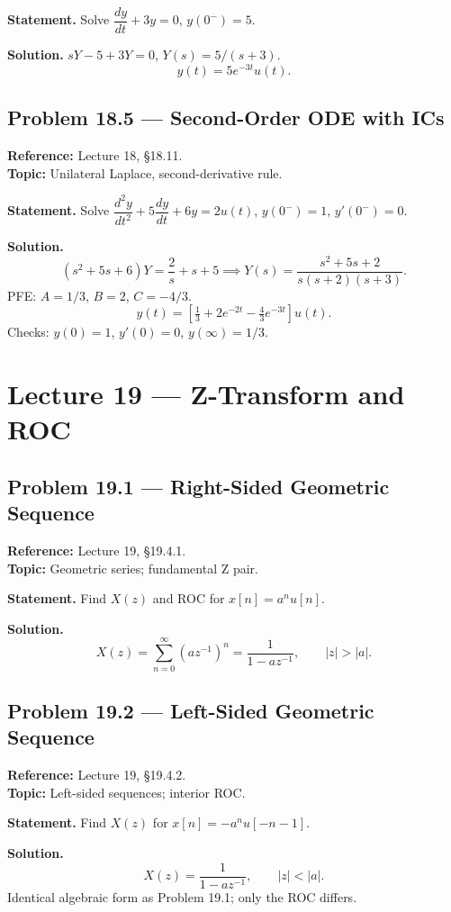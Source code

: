 \documentclass[11pt]{article}
\begin{document}
\textbf{Statement.} Solve $\dfrac{dy}{dt}+3y=0$, $y(0^-)=5$.

\textbf{Solution.} $sY-5+3Y=0$, $Y(s)=5/(s+3)$.
\[
\boxed{y(t) = 5e^{-3t}u(t)}.
\]

\subsection{Problem 18.5 --- Second-Order ODE with ICs}
\textbf{Reference:} Lecture 18, \S 18.11.\\
\textbf{Topic:} Unilateral Laplace, second-derivative rule.

\textbf{Statement.} Solve $\dfrac{d^2 y}{dt^2}+5\dfrac{dy}{dt}+6y = 2u(t)$, $y(0^-)=1$, $y'(0^-)=0$.

\textbf{Solution.}
\[
(s^2+5s+6)Y = \frac{2}{s}+s+5 \implies Y(s) = \frac{s^2+5s+2}{s(s+2)(s+3)}.
\]
PFE: $A=1/3$, $B=2$, $C=-4/3$.
\[
\boxed{y(t) = \left[\tfrac{1}{3}+2e^{-2t}-\tfrac{4}{3}e^{-3t}\right]u(t)}.
\]
Checks: $y(0)=1$, $y'(0)=0$, $y(\infty) = 1/3$.

\section{Lecture 19 --- Z-Transform and ROC}

\subsection{Problem 19.1 --- Right-Sided Geometric Sequence}
\textbf{Reference:} Lecture 19, \S 19.4.1.\\
\textbf{Topic:} Geometric series; fundamental Z pair.

\textbf{Statement.} Find $X(z)$ and ROC for $x[n]=a^n u[n]$.

\textbf{Solution.}
\[
X(z) = \sum_{n=0}^\infty (az^{-1})^n = \frac{1}{1-az^{-1}},\qquad |z|>|a|.
\]

\subsection{Problem 19.2 --- Left-Sided Geometric Sequence}
\textbf{Reference:} Lecture 19, \S 19.4.2.\\
\textbf{Topic:} Left-sided sequences; interior ROC.

\textbf{Statement.} Find $X(z)$ for $x[n]=-a^n u[-n-1]$.

\textbf{Solution.}
\[
X(z) = \frac{1}{1-az^{-1}},\qquad |z|<|a|.
\]
Identical algebraic form as Problem 19.1; only the ROC differs.
\end{document}
